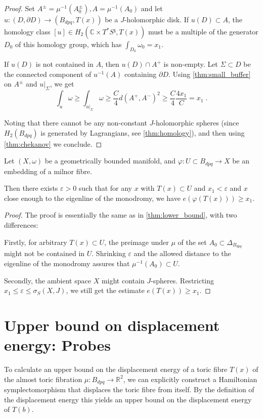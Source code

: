 \documentclass[12pt,a4paper,draft]{scrartcl}
\begin{document}
\begin{proof}
  Set $A^± = μ^{-1}(A_0^±), A = μ^{-1}(A_0)$ and let $u\colon (D,∂D) → (B_{dpq}, T(x))$ be a $J$-holomorphic disk. If $u(D) ⊂ A$, the homology class $[u] ∈ H_2(ℂ × T^*S¹, T(x))$ must be a multiple of the generator $D_0$ of this homology group, which has $∫_{D_0} ω_0 = x_1$.
  
  If $u(D)$ is not contained in $A$, then $u(D) ∩ A^+$ is non-empty. Let $Σ ⊂ D$ be the connected component of $u^{-1}(A)$ containing $∂D$. Using \cref{thm:small_buffer} on $A^±$ and $u|_Σ$, we get
  \[∫_u ω ≥ ∫_{u|_Σ} ω ≥ \frac{C}{4} d(A^+,A^-)^2 ≥ \frac{C}{4} \frac{4x_1}{C} = x_1 \;. \]

  Noting that there cannot be any non-constant $J$-holomorphic spheres (since $H_2(B_{dpq})$ is generated by Lagrangians, see \cref{thm:homology}), and then using \cref{thm:chekanov} we conclude.
\end{proof}

\begin{proposition}
  \label{thm:embedded_lower_bound}
  Let $(X,ω)$ be a geometrically bounded manifold, and $φ \colon U ⊂ B_{dpq} → X$ be an embedding of a milnor fibre.

  Then there exists $ε>0$ such that for any $x$ with $T(x) ⊂ U$ and $x_1<ε$ and $x$ close enough to the eigenline of the monodromy, we have $e(φ(T(x))) ≥ x_1$.
\end{proposition}

\begin{proof}
  The proof is essentially the same as in \cref{thm:lower_bound}, with two differences:

  Firstly, for arbitrary $T(x) ⊂ U$, the preimage under $μ$ of the set $A_0 ⊂ Δ_{B_{dpq}}$ might not be contained in $U$.
  Shrinking $ε$ and the allowed distance to the eigenline of the monodromy assures that $μ^{-1}(A_0) ⊂ U$.

  Secondly, the ambient space $X$ might contain $J$-spheres. Restricting $x_1 ≤ ε ≤ σ_S(X,J)$, we still get the estimate $e(T(x)) ≥ x_1$.

\end{proof}

\section{Upper bound on displacement energy: Probes}
\label{sec:upper_bound}

To calculate an upper bound on the displacement energy of a toric fibre $T(x)$ of the almost toric fibration $\mu \colon B_{dpq}\to \mathbb{R}^2$, we can explicitly construct a Hamiltonian symplectomorphism that displaces the toric fibre from itself.
By the definition of the displacement energy this yields an upper bound on the displacement energy of $T(b)$.
\end{document}

